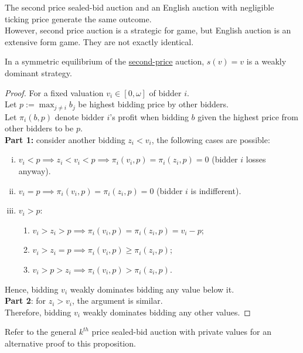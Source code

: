 \documentclass{article}
\begin{document}
	\begin{remark}
		The second price sealed-bid auction and an English auction with negligible ticking price generate the same outcome. \\
		However, second price auction is a strategic for game, but English auction is an extensive form game. They are not exactly identical.
	\end{remark}

	\begin{proposition}
		In a symmetric equilibrium of the \ul{second-price} auction, $s(v) = v$ is a weakly dominant strategy.
	\end{proposition}
	
	\begin{proof}
		For a fixed valuation $v_i \in [0, \omega]$ of bidder $i$. \\
		Let $p := \max_{j \neq i} b_j$ be highest bidding price by other bidders. \\
		Let $\pi_i(b, p)$ denote bidder $i$'s profit when bidding $b$ given the highest price from other bidders to be $p$. \\
		\textbf{Part 1:} consider another bidding $z_i < v_i$, the following cases are possible: 
		\begin{enumerate}[(i)]
			\item $v_i < p \implies z_i < v_i < p \implies \pi_i(v_i, p) = \pi_i(z_i, p) = 0$ (bidder $i$ losses anyway).
			\item $v_i = p \implies \pi_i(v_i, p) = \pi_i(z_i, p) = 0$ (bidder $i$ is indifferent).
			\item $v_i > p$:
			\begin{enumerate}
				\item $v_i > z_i > p \implies \pi_i(v_i, p) = \pi_i(z_i, p) = v_i - p$;
				\item $v_i > z_i = p \implies \pi_i(v_i, p) \geq \pi_i(z_i, p)$;
				\item $v_i > p > z_i \implies \pi_i(v_i, p) > \pi_i(z_i, p)$.
			\end{enumerate}
		\end{enumerate}
		Hence, bidding $v_i$ weakly dominates bidding any value below it. \\
		\textbf{Part 2}: for $z_i > v_i$, the argument is similar. \\
		Therefore, bidding $v_i$ weakly dominates bidding any other values.
	\end{proof}
	
	\begin{remark}
		Refer to the general $k^{th}$ price sealed-bid auction with private values for an alternative proof to this proposition.
	\end{remark}
	
\end{document}
